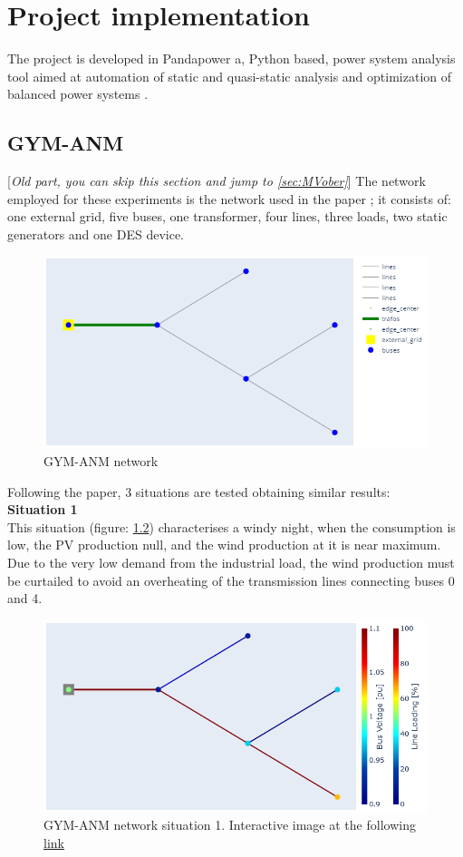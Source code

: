 \chapter{Project implementation}
The project is developed in Pandapower a, Python based, power system analysis tool aimed at automation of static and quasi-static analysis and optimization of balanced power systems \cite{pandapower}.

\section{GYM-ANM}
[\emph{Old part, you can skip this section and jump to \ref{sec:MVober}}] The network employed for these experiments is the network used in the paper \cite{gym-anm}; it consists of: one external grid, five buses, one transformer, four lines, three loads, two static generators and one \gls{DES} device.

\begin{figure}[h]
\centering
    \includegraphics[width=.7\linewidth]{images/GYM-ANM/NETS/Gyn-anm network.png}
\caption{GYM-ANM network}
\label{fig:gym_anm_net}
\end{figure}

\noindent Following the paper, 3 situations are tested obtaining similar results:\\
\textbf{Situation 1} \\
    This situation (figure: \ref{fig:net_sit1}) characterises a windy night, when the consumption is low, the PV
    production null, and the wind production at it is near maximum. Due to the very low demand from the industrial load, the wind production must be curtailed to avoid an overheating of the transmission lines connecting
    buses 0 and 4.
    \begin{figure}[H]
    \centering
        \includegraphics[width=.7\linewidth]{images/GYM-ANM/NETS/Gyn-anm network situation1.png}
    \caption[GYM-ANM network situation 1]{GYM-ANM network situation 1. Interactive image at the following \href{https://htmlpreview.github.io/?https://github.com/MauriVass/ThesisLiege/blob/master/Images/fig_case1.html}{link}}
    \label{fig:net_sit1}
    \end{figure}
    
